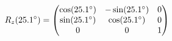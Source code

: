 \documentclass[preview]{standalone}
\begin{document}
\begin{align*}
\special{dvisvgm:raw <g id='unique000'>}R_z(25.1^\circ) = \begin{pmatrix} \cos(25.1^\circ) & -\sin(25.1^\circ) & 0 \\ \sin(25.1^\circ) & \cos(25.1^\circ) & 0 \\ 0 & 0 & 1 \end{pmatrix}\special{dvisvgm:raw </g>}
\end{align*}
\end{document}
